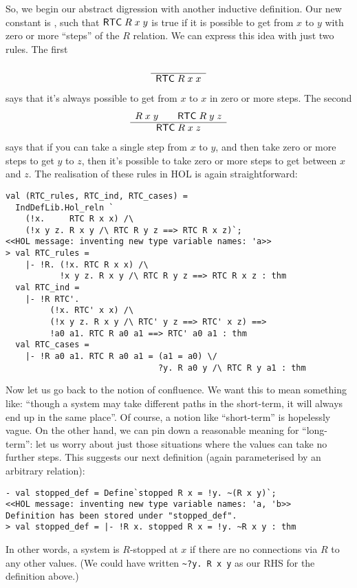 \documentclass[12pt]{article}
\newcommand{\infer}[2]{\begin{array}{c}#2\\ \hline #1\end{array}}
\begin{document}
So, we begin our abstract digression with another inductive
definition.  Our new constant is , such that
${\sf RTC}\;R\;x\;y$ is true if it is possible to get from $x$ to $y$
with zero or more ``steps'' of the $R$ relation.  We can express this
idea with just two rules.  The first \[
\infer{\con{RTC}\;R\;x\;x}{} \]
says that it's always possible to get from $x$ to $x$ in zero or more
steps.  The second \[
\infer{\con{RTC}\;R\;x\;z}{R\;x\;y\qquad\con{RTC}\;R\;y\;z}
\] says that if you can take a single step from $x$ to $y$, and then
take zero or more steps to get $y$ to $z$, then it's possible to take
zero or more steps to get between $x$ and $z$.  The realisation of
these rules in HOL is again straightforward:
\begin{session}\begin{verbatim}
val (RTC_rules, RTC_ind, RTC_cases) =
  IndDefLib.Hol_reln `
    (!x.     RTC R x x) /\
    (!x y z. R x y /\ RTC R y z ==> RTC R x z)`;
<<HOL message: inventing new type variable names: 'a>>
> val RTC_rules =
    |- !R. (!x. RTC R x x) /\
           !x y z. R x y /\ RTC R y z ==> RTC R x z : thm
  val RTC_ind =
    |- !R RTC'.
         (!x. RTC' x x) /\
         (!x y z. R x y /\ RTC' y z ==> RTC' x z) ==>
         !a0 a1. RTC R a0 a1 ==> RTC' a0 a1 : thm
  val RTC_cases =
    |- !R a0 a1. RTC R a0 a1 = (a1 = a0) \/
                               ?y. R a0 y /\ RTC R y a1 : thm
\end{verbatim}\end{session}
Now let us go back to the notion of confluence.  We want this to mean
something like: ``though a system may take different paths in the
short-term, it will always end up in the same place''.  Of course, a
notion like ``short-term'' is hopelessly vague.   On the other hand,
we can pin down a reasonable meaning for ``long-term'': let us worry
about just those situations where the values can take no further
steps.  This suggests our next definition (again parameterised by an
arbitrary relation):
\begin{session}\begin{verbatim}
- val stopped_def = Define`stopped R x = !y. ~(R x y)`;
<<HOL message: inventing new type variable names: 'a, 'b>>
Definition has been stored under "stopped_def".
> val stopped_def = |- !R x. stopped R x = !y. ~R x y : thm
\end{verbatim}\end{session}
In other words, a system is $R$-stopped at $x$ if there are no
connections via $R$ to any other values.  (We could have written
\verb!~?y. R x y! as our RHS for the definition above.)
\end{document}
